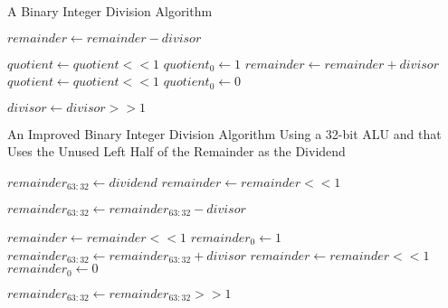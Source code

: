 \documentclass[11pt]{article}
\begin{document}
\begin{algorithm}[hbt!]
\caption{A Binary Integer Division Algorithm}\label{alg:div1}
\begin{algorithmic}

    \State $remainder \gets remainder - divisor$
    
        \State $quotient \gets quotient << 1$
        \State $quotient_{0} \gets 1$
    \Else
        \State $remainder \gets remainder + divisor$
        \State $quotient \gets quotient << 1$
        \State $quotient_{0} \gets 0$    
    \EndIf
    
    \State $divisor \gets divisor >> 1$
\EndFor

\end{algorithmic}
\end{algorithm}

\pagebreak

\begin{algorithm}[hbt!]
\caption{An Improved Binary Integer Division Algorithm Using a 32-bit ALU and that Uses the Unused Left Half of the Remainder as the Dividend}\label{alg:div1}
\begin{algorithmic}

\State $remainder_{63:32} \gets dividend$
\State $remainder \gets remainder << 1$

    \State $remainder_{63:32} \gets remainder_{63:32} - divisor$
    
        \State $remainder \gets remainder << 1$
        \State $remainder_{0} \gets 1$
    \Else
        \State $remainder_{63:32} \gets remainder_{63:32} + divisor$
        \State $remainder \gets remainder << 1$
        \State $remainder_{0} \gets 0$    
    \EndIf
    
    \State $remainder_{63:32} \gets remainder_{63:32} >> 1$
\EndFor

\end{algorithmic}
\end{algorithm}
\end{document}
